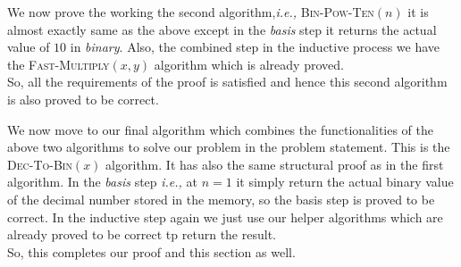 \documentclass[12pt,a4paper]{article}%
\begin{document}
\begin{flushleft}
		We now prove the working the second algorithm,\textit{i.e.,} \textsc{Bin-Pow-Ten}$(n)$ it is almost exactly same as the above except in the \textit{basis} step it returns the actual value of $10$ in \textit{binary}. Also, the combined step in the inductive process we have the \textsc{Fast-Multiply}$(x,y)$ algorithm which is already proved. \\\smallskip 
		So, all the requirements of the proof is satisfied and hence this second algorithm is also proved to be correct.\\\bigskip
		
		We now move to our final algorithm which combines the functionalities of the above two algorithms to solve our problem in the problem statement. This is the \textsc{Dec-To-Bin}$(x)$ algorithm. It has also the same structural proof as in the first algorithm. In the \textit{basis} step \textit{i.e.,} at $n=1$ it simply  return the actual binary value of the decimal number stored in the memory, so the basis step is proved to be correct. In the inductive step again we just use our helper algorithms which are already proved to be correct tp return the result.\\\smallskip
		So, this completes our proof and this section as well.
		
	\end{flushleft}

	
	
	
	
	
\end{document}

